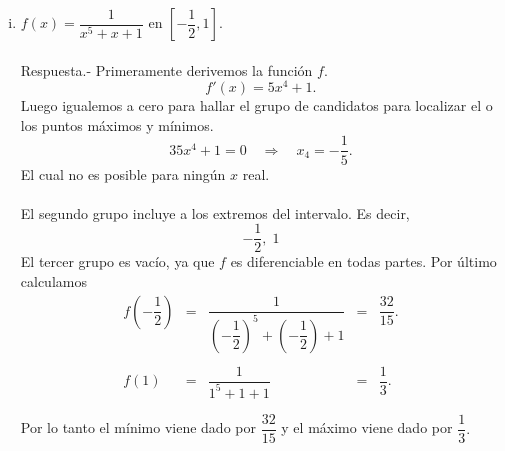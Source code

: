 \begin{enumerate}[\bfseries 1.]
\begin{enumerate}[(i)]
	    \item $f(x)=\dfrac{1}{x^5+x+1}$ en $\left[-\dfrac{1}{2},1\right]$.\\\\
		Respuesta.-\; Primeramente derivemos la función $f$.
		$$f'(x)=5x^4+1.$$
		Luego igualemos a cero para hallar el grupo de candidatos para localizar el o los puntos máximos y mínimos.
		$$35x^4+1=0 \quad \Rightarrow \quad x_4=-\dfrac{1}{5}.$$
		El cual no es posible para ningún $x$ real.\\\\
		El segundo grupo incluye a los extremos del intervalo. Es decir,
		$$-\dfrac{1}{2},\;1$$
		El tercer grupo es vacío, ya que $f$ es diferenciable en todas partes. Por último calculamos 
		$$\begin{array}{ccccl}
		    f\left(-\dfrac{1}{2}\right) &=& \dfrac{1}{\left(-\dfrac{1}{2}\right)^5+\left(-\dfrac{1}{2}\right)+1} &=&\dfrac{32}{15}.\\\\
		    f\left(1\right) &=& \dfrac{1}{1^5+1+1} &=&\dfrac{1}{3}.\\\\
		\end{array}$$
		Por lo tanto el mínimo viene dado por $\dfrac{32}{15}$ y el máximo viene dado por $\dfrac{1}{3}.$\\\\


\end{enumerate}
\end{enumerate}
